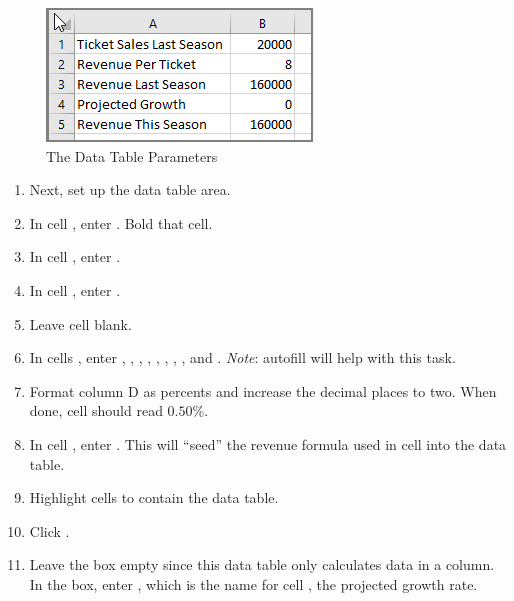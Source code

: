 \begin{enumerate}
\end{enumerate}

\begin{figure}[H]
	\centering
	\includegraphics[width=\maxwidth{.95\linewidth}]{gfx/ch08_fig17}
	\caption{The Data Table Parameters}
	\label{08:fig17}
\end{figure}

\begin{enumerate}[resume]
	 
	\item Next, set up the data table area.
	\item In cell , enter . Bold that cell.
	\item In cell , enter .
	\item In cell , enter .
	\item Leave cell  blank.
	\item In cells , enter , , , , , , , ,  and . \textit{Note}: autofill will help with this task.
	\item Format column D as percents and increase the decimal places to two. When done, cell  should read $ 0.50 $\%.
	\item In cell , enter . This will ``seed'' the revenue formula used in cell  into the data table.
	\item Highlight cells  to contain the data table.
	\item Click .
	\item Leave the  box empty since this data table only calculates data in a column. In the  box, enter , which is the name for cell , the projected growth rate.
	
\end{enumerate}

